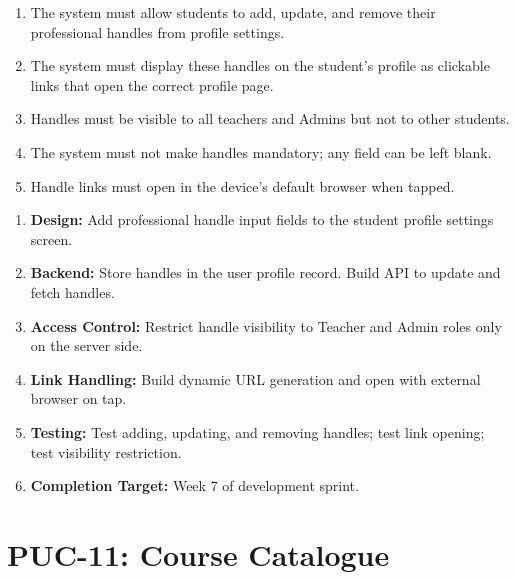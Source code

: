\documentclass[12pt,a4paper]{article}
\begin{document}
\begin{tcolorbox}[frbox, title={Functional Requirements --- PUC-10}]
\begin{enumerate}[leftmargin=*, label=\textbf{FR-10.\arabic*}, itemsep=5pt]
  \item The system must allow students to add, update, and remove their professional handles from profile settings.
  \item The system must display these handles on the student's profile as clickable links that open the correct profile page.
  \item Handles must be visible to all teachers and Admins but not to other students.
  \item The system must not make handles mandatory; any field can be left blank.
  \item Handle links must open in the device's default browser when tapped.
\end{enumerate}
\end{tcolorbox}

\begin{tcolorbox}[planbox, title={Completion Plan --- PUC-10}]
\begin{enumerate}[leftmargin=*, label=\textbf{Step \arabic*:}, itemsep=4pt]
  \item \textbf{Design:} Add professional handle input fields to the student profile settings screen.
  \item \textbf{Backend:} Store handles in the user profile record. Build API to update and fetch handles.
  \item \textbf{Access Control:} Restrict handle visibility to Teacher and Admin roles only on the server side.
  \item \textbf{Link Handling:} Build dynamic URL generation and open with external browser on tap.
  \item \textbf{Testing:} Test adding, updating, and removing handles; test link opening; test visibility restriction.
  \item \textbf{Completion Target:} Week 7 of development sprint.
\end{enumerate}
\end{tcolorbox}

\newpage
\section{PUC-11: Course Catalogue}
\end{document}
